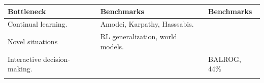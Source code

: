 \documentclass[
  letterpaper,
  DIV=11,
  numbers=noendperiod,
  oneside]{scrartcl}
\begin{document}
\begin{longtable}[]{@{}
  >{\raggedright\arraybackslash}p{}
  >{\raggedright\arraybackslash}p{}
  >{\raggedright\arraybackslash}p{}@{}}
\toprule\noalign{}
\begin{minipage}[b]{\linewidth}\raggedright
Bottleneck
\end{minipage} & \begin{minipage}[b]{\linewidth}\raggedright
Benchmarks
\end{minipage} & \begin{minipage}[b]{\linewidth}\raggedright
Benchmarks
\end{minipage} \\
\midrule\noalign{}
\endhead
\bottomrule\noalign{}
\endlastfoot
Continual learning. & Amodei, Karpathy, Hasssabis. & \\
Novel situations & RL generalization, world models. & \\
Interactive decision-making. & & BALROG, 44\% \\
& & \\
\end{longtable}
\end{document}
